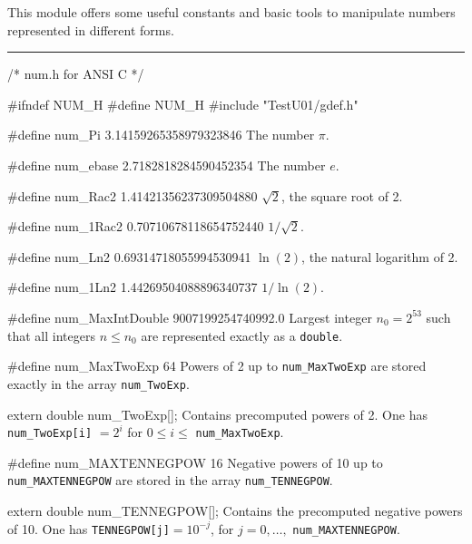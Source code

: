 
This module offers some useful constants and basic tools to 
manipulate numbers represented in different forms.

\bigskip\hrule
\code\hide
/* num.h for ANSI C */

#ifndef NUM_H
#define NUM_H
\endhide
#include "TestU01/gdef.h"
\endcode

\code

#define num_Pi     3.14159265358979323846
\endcode
  \tab The number $\pi$.
  \endtab
\code

#define num_ebase  2.7182818284590452354
\endcode
  \tab The number $e$.
  \endtab
\code

#define num_Rac2   1.41421356237309504880
\endcode
  \tab $\sqrt{2}$, the square root of 2.
  \endtab
\code

#define num_1Rac2  0.70710678118654752440
\endcode
  \tab $1/\sqrt{2}$.
  \endtab
\code

#define num_Ln2    0.69314718055994530941
\endcode
  \tab $\ln(2)$, the natural logarithm of 2.
  \endtab
\code

#define num_1Ln2   1.44269504088896340737
\endcode
  \tab $1 / \ln(2)$.
  \endtab
\code

#define num_MaxIntDouble   9007199254740992.0
\endcode
  \tab Largest integer $n_0 = 2^{53}$ such that all integers
  $n \le n_0$ are represented  exactly as a {\tt double}.
  \endtab


\code

#define num_MaxTwoExp   64
\endcode
  \tab Powers of 2 up to {\tt num\_MaxTwoExp} are stored exactly 
  in the array {\tt num\_TwoExp}.
  \endtab
\code

extern double num_TwoExp[];   
\endcode
  \tab  Contains precomputed powers of 2.
  One has {\tt num\_TwoExp[i]} $= 2^i$ for $0 \le i \le$ 
  {\tt num\_MaxTwoExp}.
\endtab
\code

#define num_MAXTENNEGPOW   16
\endcode
  \tab Negative powers of 10 up to {\tt num\_MAXTENNEGPOW} are stored
  in the array {\tt num\_TENNEGPOW}.
  \endtab
\code

extern double num_TENNEGPOW[];
\endcode
 \tab Contains the precomputed negative powers of 10.
   One has {\tt TENNEGPOW[j]}$ = 10^{-j}$, for $j=0,\ldots,$
 {\tt num\_MAXTENNEGPOW}.
\endtab


\code

